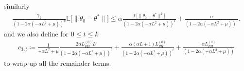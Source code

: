 \documentclass[a4paper]{article}
\newcommand{\norm}[1]{\|#1 \|}
\newcommand{\Exs}{\mathbb{E}}
\newcommand{\thetastar}{\theta^*}
\newcommand{\constLPH}[1]{L_{PH}^{(#1)}}
\newcommand{\stepsize}{\alpha}
\begin{document}
	similarly
	\begin{align*}
		\frac{\gamma_1}{(1 - 2 \stepsize (-\stepsize L^2 + \mu))^k} \Exs \big[ \norm{\theta_0 - \thetastar} \big] \leq \stepsize \frac{\Exs \big[ \norm{\theta_0 - \thetastar}^2 \big]}{(1 - 2 \stepsize (-\stepsize L^2 + \mu))^1} + \frac{\stepsize}{(1 - 2 \stepsize (-\stepsize L^2 + \mu))^1}.
	\end{align*}
	and we also define for $0 \le t \le k$
	\begin{align*}
		c_{3, t} \coloneq \frac{1}{-\stepsize L^{2} + \mu}\frac{2\stepsize\constLPH{0}L}{\left(1 - 2\stepsize\left(-\stepsize L^{2} + \mu\right)\right)^{t}} + \frac{\stepsize\left(\stepsize L + 1\right)\constLPH{0}}{\left(1 - 2\stepsize\left(-\stepsize L^{2} + \mu\right)\right)^{t}} + \frac{\stepsize\constLPH{0}}{\left(1 - 2\stepsize\left(-\stepsize L^{2} + \mu\right)\right)}
	\end{align*}
	to wrap up all the remainder terms.
	
\end{document}
